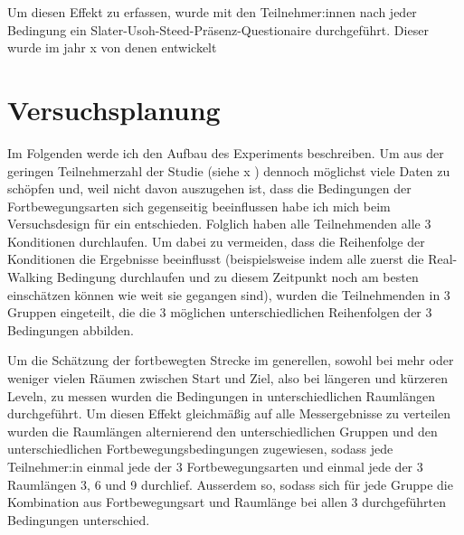             Um diesen Effekt zu erfassen, wurde mit den Teilnehmer:innen nach jeder Bedingung ein Slater-Usoh-Steed-Präsenz-Questionaire durchgeführt. Dieser wurde im jahr x von denen entwickelt %



    \section{Versuchsplanung}\label{sec:setup}
    Im Folgenden werde ich den Aufbau des Experiments beschreiben.
    Um aus der geringen Teilnehmerzahl der Studie (siehe x ) %
    dennoch möglichst viele Daten zu schöpfen %
    und, weil nicht davon auszugehen ist, dass die Bedingungen der Fortbewegungsarten sich gegenseitig beeinflussen habe ich mich beim
    Versuchsdesign für ein  entschieden. Folglich haben alle Teilnehmenden alle 3 Konditionen durchlaufen. Um dabei zu vermeiden, dass die Reihenfolge der Konditionen die Ergebnisse beeinflusst (beispielsweise indem alle zuerst die Real-Walking Bedingung durchlaufen und zu diesem Zeitpunkt noch am besten einschätzen können wie weit sie gegangen sind), wurden die Teilnehmenden in 3 Gruppen eingeteilt, die die 3 möglichen unterschiedlichen Reihenfolgen der 3 Bedingungen abbilden.

    Um die Schätzung der fortbewegten Strecke im generellen, sowohl bei mehr oder weniger vielen Räumen zwischen Start und Ziel, also bei längeren und kürzeren Leveln, zu messen wurden die Bedingungen in unterschiedlichen Raumlängen durchgeführt. %
    Um diesen Effekt gleichmäßig auf alle Messergebnisse zu verteilen wurden die Raumlängen alternierend den unterschiedlichen Gruppen und den unterschiedlichen Fortbewegungsbedingungen zugewiesen, sodass jede Teilnehmer:in einmal jede der 3 Fortbewegungsarten und einmal jede der 3 Raumlängen 3, 6 und 9 durchlief. Ausserdem so, sodass sich für jede Gruppe die Kombination aus Fortbewegungsart und Raumlänge bei allen 3 durchgeführten Bedingungen unterschied.


